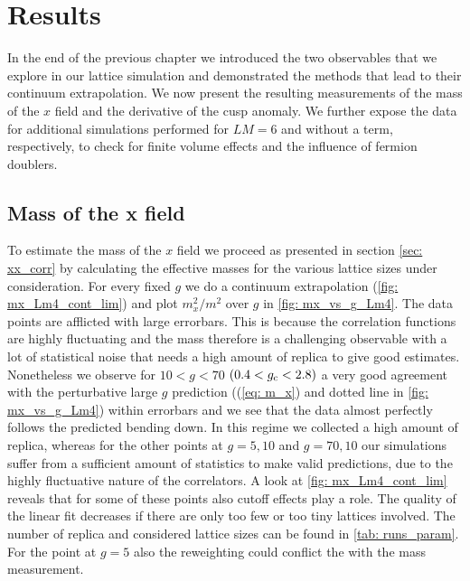 \chapter{Results}
In the end of the previous chapter we introduced the two observables that we explore in our lattice simulation and demonstrated the methods that lead to their continuum extrapolation. We now present the resulting measurements of the mass of the $x$ field and the derivative of the cusp anomaly. We further expose the data for additional simulations performed for $LM=6$ and without a  term, respectively, to check for finite volume effects and the influence of fermion doublers.
%
%
%
%
%
%
\section[Mass of the x field]{Mass of the x field}
To estimate the mass of the $x$ field we proceed as presented in section \ref{sec: xx_corr} by calculating the effective masses for the various lattice sizes under consideration. For every fixed $g$ we do a continuum extrapolation (\autoref{fig: mx_Lm4_cont_lim}) and plot $m_{x}^{2}/m^{2}$ over $g$ in \autoref{fig: mx_vs_g_Lm4}. The data points are afflicted with large errorbars. This is because the correlation functions are highly fluctuating and the mass therefore is a challenging observable with a lot of statistical noise that needs a high amount of replica to give good estimates. Nonetheless we observe for $10 < g < 70$ $(0.4 < g_{\rm c} < 2.8)$ a very good agreement with the perturbative large $g$ prediction ((\ref{eq: m_x}) and dotted line in \autoref{fig: mx_vs_g_Lm4}) within errorbars and we see that the data almost perfectly follows the predicted bending down. In this regime we collected a high amount of replica, whereas for the other points at $g=5,10$ and $g=70,10$ our simulations suffer from a sufficient amount of statistics to make valid predictions, due to the highly fluctuative nature of the correlators. A look at \autoref{fig: mx_Lm4_cont_lim} reveals that for some of these points also cutoff effects play a role. The quality of the linear fit decreases if there are only too few or too tiny lattices involved. The number of replica and considered lattice sizes can be found in \autoref{tab: runs_param}. For the point at $g=5$ also the reweighting could conflict the with the mass measurement.
%
%
%
